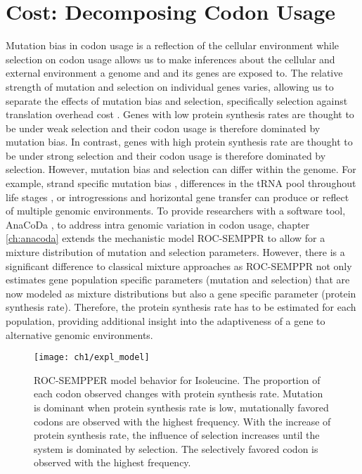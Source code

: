 \section{Cost: Decomposing Codon Usage}

Mutation bias in codon usage is a reflection of the cellular environment while selection on codon usage allows us to make inferences about the cellular and external environment a genome and and its genes are exposed to.
The relative strength of mutation and selection on individual genes varies, allowing us to separate the effects of mutation bias and selection, specifically selection against translation overhead cost \citep{gilchrist2007,ShahAndGilchrist2011,gilchrist2015}.
Genes with low protein synthesis rates are thought to be under weak selection and their codon usage is therefore dominated by mutation bias.
In contrast, genes with high protein synthesis rate are thought to be under strong selection and their codon usage is therefore dominated by selection.
However, mutation bias and selection can differ within the genome.
For example, strand specific mutation bias \citep{Lafay1999,Romero2000}, differences in the tRNA pool throughout life stages \citep{sagi2016}, or introgressions and horizontal gene transfer \citep{medigue1991,lawrence1997} can produce or reflect of multiple genomic environments.
To provide researchers with a software tool, AnaCoDa \cite{landerer2018}, to address intra genomic variation in codon usage, chapter \ref{ch:anacoda} extends the mechanistic model ROC-SEMPPR \cite{gilchrist2015} to allow for a mixture distribution of mutation and selection parameters.
However, there is a significant difference to classical mixture approaches as ROC-SEMPPR not only estimates gene population specific parameters (mutation and selection) that are now modeled as mixture distributions but also a gene specific parameter (protein synthesis rate). 
Therefore, the protein synthesis rate has to be estimated for each population, providing additional insight into the adaptiveness of a gene to alternative genomic environments.

\singlespacing
\begin{figure}[H]
     \centering
	\texttt{[image: ch1/expl\_model]}
	\caption{ROC-SEMPPER model behavior for Isoleucine.
	The proportion of each codon observed changes with protein synthesis rate.
	Mutation is dominant when protein synthesis rate is low, mutationally favored codons are observed with the highest frequency.
	With the increase of protein synthesis rate, the influence of selection increases until the system is dominated by selection.
	The selectively favored codon is observed with the highest frequency.}
	\label{fig:expl_model}
\end{figure}
\doublespacing

